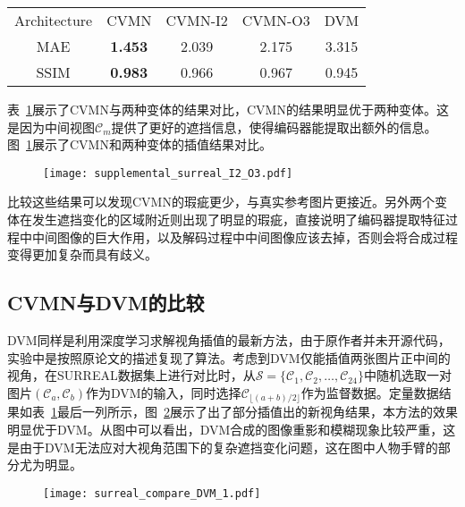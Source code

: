 \begin{table}[!htbp]
\label{tab:cvmn_surreal}
\centering
\footnotesize%
\setlength{\tabcolsep}{4pt}%
\renewcommand{\arraystretch}{0.9}%
\begin{tabular}{c cccc}
\hline\noalign{\smallskip}
Architecture & CVMN & CVMN-I2 & CVMN-O3 & DVM\citep{Ji_2017_CVPR} \\
\noalign{\smallskip}
\hline
\noalign{\smallskip}
MAE  & \textbf{1.453} & 2.039 & 2.175 & 3.315\\
SSIM & \textbf{0.983} & 0.966 & 0.967 & 0.945\\
\hline
\end{tabular}
\end{table}
表~\ref{tab:cvmn_surreal}展示了CVMN与两种变体的结果对比，CVMN的结果明显优于两种变体。这是因为中间视图$\mathcal{C}_m$提供了更好的遮挡信息，使得编码器能提取出额外的信息。图~\ref{fig:cvmn_i2_o3}展示了CVMN和两种变体的插值结果对比。
\begin{figure}[!htbp]
    \centering
    \texttt{[image: supplemental\_surreal\_I2\_O3.pdf]}
    \label{fig:cvmn_i2_o3}
\end{figure}
比较这些结果可以发现CVMN的瑕疵更少，与真实参考图片更接近。另外两个变体在发生遮挡变化的区域附近则出现了明显的瑕疵，直接说明了编码器提取特征过程中中间图像的巨大作用，以及解码过程中中间图像应该去掉，否则会将合成过程变得更加复杂而具有歧义。

\subsection{CVMN与DVM的比较}
DVM\citep{Ji_2017_CVPR}同样是利用深度学习求解视角插值的最新方法，由于原作者并未开源代码，实验中是按照原论文的描述复现了算法。考虑到DVM仅能插值两张图片正中间的视角，在SURREAL数据集上进行对比时，从$\mathcal{S}=\{\mathcal{C}_1, \mathcal{C}_2, \dots, \mathcal{C}_{24}\}$中随机选取一对图片$(\mathcal{C}_a, \mathcal{C}_b)$作为DVM的输入，同时选择$\mathcal{C}_{\lfloor (a+b)/2\rfloor}$作为监督数据。定量数据结果如表~\ref{tab:cvmn_surreal}最后一列所示，图~\ref{fig:cvmn_dvm}展示了出了部分插值出的新视角结果，本方法的效果明显优于DVM。从图中可以看出，DVM合成的图像重影和模糊现象比较严重，这是由于DVM无法应对大视角范围下的复杂遮挡变化问题，这在图中人物手臂的部分尤为明显。
\begin{figure}[!htbp]
    \centering
    \texttt{[image: surreal\_compare\_DVM\_1.pdf]}
    \label{fig:cvmn_dvm}
\end{figure}

